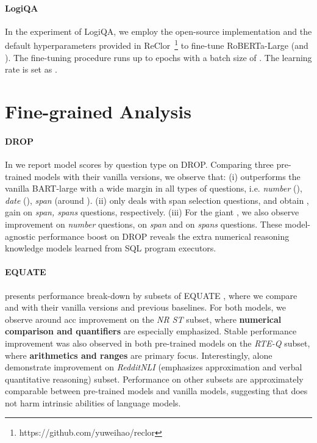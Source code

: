 \paragraph{LogiQA}

In the experiment of LogiQA, we employ the open-source implementation and the default hyperparameters provided in ReClor~\footnote{https://github.com/yuweihao/reclor} \citep{yu2020reclor} to fine-tune RoBERTa-Large (and \oursroberta).
The fine-tuning procedure runs up to  epochs with a batch size of .
The learning rate is set as .

\section{Fine-grained Analysis}\label{sec:fine_analysis}

\paragraph{DROP} In  we report model \fone{} scores by question type on DROP. Comparing three \ours pre-trained models with their vanilla versions, we observe that: (i) \oursbart outperforms the vanilla BART-large with a wide margin in all types of questions, i.e. \textit{number} (), \textit{date} (), \textit{span} (around ). (ii) \oursroberta only deals with span selection questions, and obtain ,  gain on \textit{span, spans} questions, respectively.
(iii) For the giant \ourstfive, we also observe  improvement on \textit{number} questions,  on \textit{span} and  on \textit{spans} questions. These model-agnostic performance boost on DROP reveals the extra numerical reasoning knowledge models learned from SQL program executors.

\paragraph{EQUATE}
 presents performance break-down by subsets of EQUATE \cite{ravichander-etal-2019-equate}, where we compare \oursbart and \oursroberta with their vanilla versions and previous baselines. For both models, we observe around  acc improvement on the \textit{NR ST} subset, where \textbf{numerical comparison and quantifiers} are especially emphasized. Stable performance improvement was also observed in both pre-trained models on  the \textit{RTE-Q} subset, where \textbf{arithmetics and ranges} are primary focus. Interestingly, \oursroberta alone demonstrate improvement on \textit{RedditNLI} (emphasizes approximation and verbal quantitative reasoning) subset. Performance on other subsets are approximately comparable between \ours pre-trained models and vanilla models, suggesting that \ours does not harm intrinsic abilities of language models.

